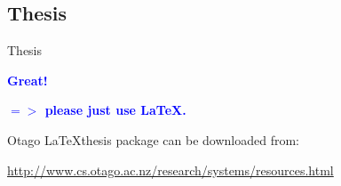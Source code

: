 \documentclass[]{beamer}
\begin{document}
\subsection{Thesis}
\begin{frame}[fragile]{Thesis}


\bf{\textcolor{blue}{Great!}} 

\vspace{0.7cm}

\tiny
{}

\vspace{0.7cm}
\large
\bf{\textcolor{blue}{$=>$ please just use \LaTeX.}}

\vspace{1cm}
Otago \LaTeX thesis package can be downloaded from:

\url{http://www.cs.otago.ac.nz/research/systems/resources.html}

\end{frame}
\end{document}
